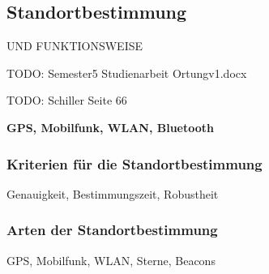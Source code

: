 \subsection{Standortbestimmung}
UND FUNKTIONSWEISE

TODO:
Semester5 Studienarbeit Ortungv1.docx

TODO:
Schiller Seite 66

\textbf{GPS, Mobilfunk, WLAN, Bluetooth}

\subsubsection{Kriterien für die Standortbestimmung}
Genauigkeit, Bestimmungszeit, Robustheit

\subsubsection{Arten der Standortbestimmung}
GPS, Mobilfunk, WLAN, Sterne, Beacons